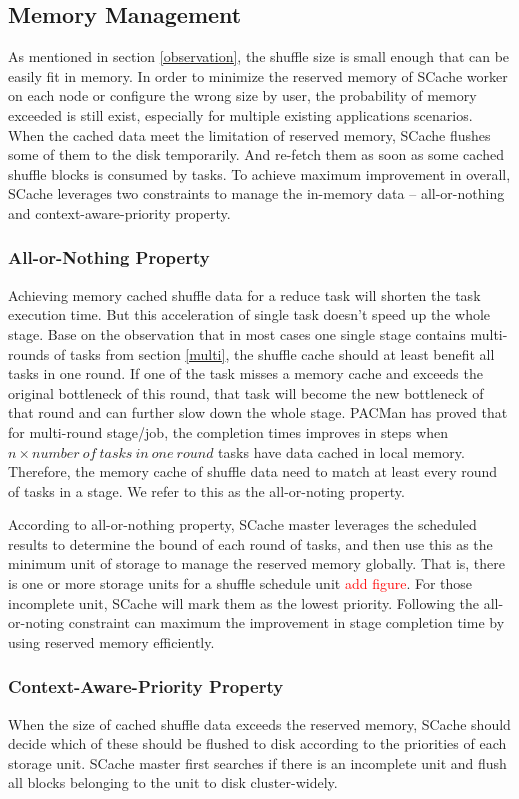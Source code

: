 \subsection{Memory Management}
As mentioned in section \ref{observation}, the shuffle size is small enough that can be easily fit in memory. In order to minimize the reserved memory of SCache worker on each node or configure the wrong size by user, the probability of memory exceeded is still exist, especially for multiple existing applications scenarios. When the cached data meet the limitation of reserved memory, SCache flushes some of them to the disk temporarily. And re-fetch them as soon as some cached shuffle blocks is consumed by tasks. To achieve maximum improvement in overall, SCache leverages two constraints to manage the in-memory data -- all-or-nothing and  context-aware-priority property.

\subsubsection{All-or-Nothing Property}
Achieving memory cached shuffle data for a reduce task will shorten the task execution time. But this acceleration of single task doesn't speed up the whole stage. Base on the observation that in most cases one single stage contains multi-rounds of tasks from section \ref{multi}, the shuffle cache should at least benefit all tasks in one round. If one of the task misses a memory cache and exceeds the original bottleneck of this round, that task will become the new bottleneck of that round and can further slow down the whole stage. PACMan\cite{pacman} has proved that for multi-round stage/job, the completion times improves in steps when $n\times number\ of\ tasks\ in\ one\ round$ tasks have data cached in local memory. Therefore, the memory cache of shuffle data need to match at least every round of tasks in a stage. We refer to this as the all-or-noting property. 

According to all-or-nothing property, SCache master leverages the scheduled results to determine the bound of each round of tasks, and then use this as the minimum unit of storage to manage the reserved memory globally. That is, there is one or more storage units for a shuffle schedule unit \textcolor{red}{add figure}. For those incomplete unit, SCache will mark them as the lowest priority. Following the all-or-noting constraint can maximum the improvement in stage completion time by using reserved memory efficiently.

\subsubsection{Context-Aware-Priority Property}
When the size of cached shuffle data exceeds the reserved memory, SCache should decide which of these should be flushed to disk according to the priorities of each storage unit. SCache master first searches if there is an incomplete unit and flush all blocks belonging to the unit to disk cluster-widely. 

